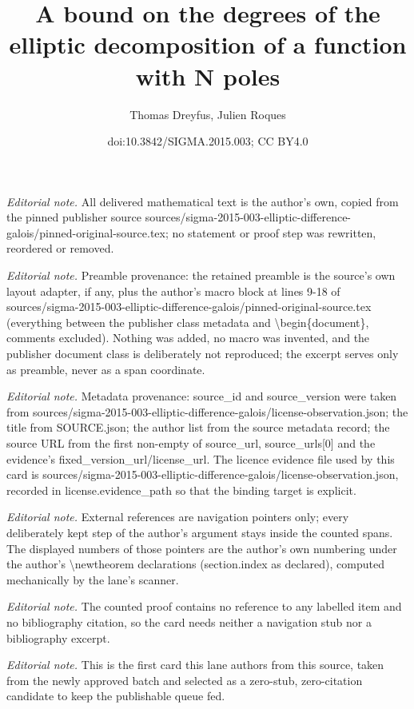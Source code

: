 \documentclass[10pt,a4paper]{amsart}
\title{A bound on the degrees of the elliptic decomposition of a function with N poles}
\author{Thomas Dreyfus, Julien Roques}
\date{doi:10.3842/SIGMA.2015.003; CC BY4.0}
\numberwithin{equation}{section}
\begin{document}
\maketitle
\noindent\textit{Editorial note.} All delivered mathematical text is the author's own, copied from the pinned publisher source sources/sigma-2015-003-elliptic-difference-galois/pinned-original-source.tex; no statement or proof step was rewritten, reordered or removed.\par\medskip
\noindent\textit{Editorial note.} Preamble provenance: the retained preamble is the source's own layout adapter, if any, plus the author's macro block at lines 9-18 of sources/sigma-2015-003-elliptic-difference-galois/pinned-original-source.tex (everything between the publisher class metadata and \textbackslash{}begin\{document\}, comments excluded). Nothing was added, no macro was invented, and the publisher document class is deliberately not reproduced; the excerpt serves only as preamble, never as a span coordinate.\par\medskip
\noindent\textit{Editorial note.} Metadata provenance: source\_id and source\_version were taken from sources/sigma-2015-003-elliptic-difference-galois/license-observation.json; the title from SOURCE.json; the author list from the source metadata record; the source URL from the first non-empty of source\_url, source\_urls[0] and the evidence's fixed\_version\_url/license\_url. The licence evidence file used by this card is sources/sigma-2015-003-elliptic-difference-galois/license-observation.json, recorded in license.evidence\_path so that the binding target is explicit.\par\medskip
\noindent\textit{Editorial note.} External references are navigation pointers only; every deliberately kept step of the author's argument stays inside the counted spans. The displayed numbers of those pointers are the author's own numbering under the author's \textbackslash{}newtheorem declarations (section.index as declared), computed mechanically by the lane's scanner.\par\medskip
\noindent\textit{Editorial note.} The counted proof contains no reference to any labelled item and no bibliography citation, so the card needs neither a navigation stub nor a bibliography excerpt.\par\medskip
\noindent\textit{Editorial note.} This is the first card this lane authors from this source, taken from the newly approved batch and selected as a zero-stub, zero-citation candidate to keep the publishable queue fed.\par\medskip
\end{document}
